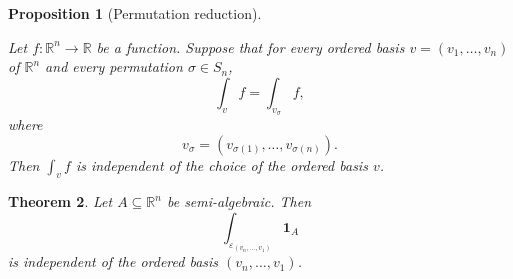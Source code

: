 \documentclass[11pt]{article}
\newtheorem{theorem}{Theorem}[section]
\newtheorem{proposition}[theorem]{Proposition}
\theoremstyle{remark}
\newcommand{\1}{\mathbf 1}
\begin{document}
\begin{proposition}[Permutation reduction]
\label{prop:permutation-reduction}

Let $f:\mathbb R^n\to\mathbb R$ be a function. Suppose that for every ordered basis
$v=(v_1,\ldots,v_n)$ of $\mathbb R^n$ and every permutation
$\sigma\in S_n$,
\[
\int_{v}f=\int_{v_\sigma}f,
\]
where
\[
v_\sigma=(v_{\sigma(1)},\ldots,v_{\sigma(n)}).
\]
Then $\int_{v}f$ is independent of the choice of the ordered basis $v$.

\end{proposition}

\begin{theorem}
\label{thm:basis-independence-schanuel-euler}
Let \(A\subseteq\mathbb{R}^n\) be semi-algebraic.  Then
\[
  \int_{\varepsilon_{(v_n,\ldots,v_1)}} \mathbf{1}_A
\]
is independent of the ordered basis \((v_n,\ldots,v_1)\).
\end{theorem}
\end{document}
